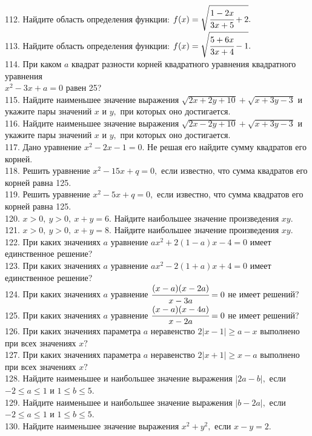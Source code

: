 \documentclass[12pt]{article}
\begin{document}
112. Найдите область определения функции: $f(x)=\sqrt{\cfrac{1-2x}{3x+5}+2}.$\\
113. Найдите область определения функции: $f(x)=\sqrt{\cfrac{5+6x}{3x+4}-1}.$\\
114. При каком $a$ квадрат разности корней квадратного уравнения квадратного уравнения\\ $x^2-3x+a=0$ равен 25?\\
115. Найдите наименьшее значение выражения $\sqrt{2x+2y+10}+\sqrt{x+3y-3}$ и укажите пары значений $x$ и $y,$ при которых оно достигается.\\
116. Найдите наименьшее значение выражения $\sqrt{2x-2y+10}+\sqrt{x+3y-3}$ и укажите пары значений $x$ и $y,$ при которых оно достигается.\\
117. Дано уравнение $x^2-2x-1=0.$ Не решая его найдите сумму квадратов его корней.\\
118. Решить уравнение $x^2-15x+q=0,$ если известно, что сумма квадратов его корней равна 125.\\
119. Решить уравнение $x^2-5x+q=0,$ если известно, что сумма квадратов его корней равна 125.\\
120. $x > 0,\ y > 0,\ x+y=6.$ Найдите наибольшее значение произведения $xy.$\\
121. $x > 0,\ y > 0,\ x+y=8.$ Найдите наибольшее значение произведения $xy.$\\
122. При каких значениях $a$ уравнение $ax^2+2(1-a)x-4=0$ имеет единственное решение?\\
123. При каких значениях $a$ уравнение $ax^2-2(1+a)x+4=0$ имеет единственное решение?\\
124. При каких значениях $a$ уравнение $\cfrac{(x-a)(x-2a)}{x-3a}=0$ не имеет решений?\\
125. При каких значениях $a$ уравнение $\cfrac{(x-a)(x-4a)}{x-2a}=0$ не имеет решений?\\
126. При каких значениях параметра $a$ неравенство $2|x-1|\geqslant a-x$ выполнено при всех значениях $x?$\\
127. При каких значениях параметра $a$ неравенство $2|x+1|\geqslant x-a$ выполнено при всех значениях $x?$\\
128. Найдите наименьшее и наибольшее значение выражения $|2a-b|,$ если $-2\leqslant a \leqslant 1$ и $1\leqslant b \leqslant 5.$\\
129. Найдите наименьшее и наибольшее значение выражения $|b-2a|,$ если $-2\leqslant a \leqslant 1$ и $1\leqslant b \leqslant 5.$\\
130. Найдите наименьшее значение выражения $x^2+y^2,$ если $x-y=2.$\\
\end{document}
